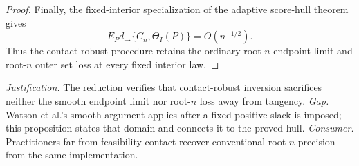 \documentclass{article}
\begin{document}
\begin{proof}
Finally, the fixed-interior specialization of the adaptive score-hull theorem gives
\[
 E_Pd_{\to}\{C_n,\Theta_I(P)\}=O(n^{-1/2}). \tag{6}
\]
Thus the contact-robust procedure retains the ordinary root-\(n\) endpoint limit and root-\(n\) outer set loss at every fixed interior law.
\end{proof}
\par\smallskip\noindent \textit{Justification.} The reduction verifies that contact-robust inversion sacrifices neither the smooth endpoint limit nor root-\(n\) loss away from tangency. \textit{Gap.} Watson et al.'s smooth argument applies after a fixed positive slack is imposed; this proposition states that domain and connects it to the proved hull. \textit{Consumer.} Practitioners far from feasibility contact recover conventional root-\(n\) precision from the same implementation.
\end{document}
